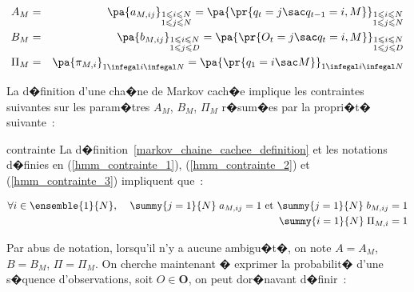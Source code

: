        \begin{eqnarray*}
        A_M    &=& \pa {  a_{M,ij} } _ {\substack{ 1\leqslant i\leqslant N\\1\leqslant j\leqslant N}} =
                   \pa{ \pr {  q_{t}=j \sac  q_{t-1} =i,M } } _{\substack{1\leqslant i\leqslant N\\1\leqslant j\leqslant N}}
                    \label{hmm_contrainte_1}\\
        B_M    &=& \pa{   b_{M,ij} } _ {\substack{1\leqslant i\leqslant N\\1\leqslant j\leqslant D}}=
                   \pa { \pr{ O_{t}=j \sac  q_{t}=i,M } }     _ {\substack{1\leqslant i\leqslant N\\1\leqslant j\leqslant D}}
                    \label{hmm_contrainte_2}\\
        \Pi_M  &=& \pa { \pi_{M,i} } _ { 1 \infegal i \infegal N } = \pa { \pr {  q_1 = i \sac M} } _ { 1 \infegal i \infegal N }
                             \label{hmm_contrainte_3}
        \end{eqnarray*}


La d�finition d'une cha�ne de Markov cach�e implique les contraintes suivantes sur les param�tres $A_M$, $B_M$, $\Pi_M$
r�sum�es par la propri�t� suivante~:


        \begin{xproperty}{contrainte}
        \label{propriete_mmc_contrainte}%
        La d�finition~\ref{markov_chaine_cachee_definition} et les notations d�finies en (\ref{hmm_contrainte_1}),
        (\ref{hmm_contrainte_2}) et (\ref{hmm_contrainte_3}) impliquent que~:
        
                \begin{eqnarray*}
                \forall i\in \ensemble{1}{N}, \; &&\summy{j=1}{N} \; a_{M,ij}=1 \text{ et }
                                                                                    \summy{j=1}{N} \; b_{M,ij}=1 \\
                                                 &&\summy{i=1}{N} \; \Pi_{M,i} = 1
                \end{eqnarray*}
        \end{xproperty}


Par abus de notation, lorsqu'il n'y a aucune ambigu�t�, on note $A=A_M$, $B=B_M$, $\Pi=\Pi_M$. On cherche maintenant � exprimer la probabilit� d'une s�quence d'observations, soit $O \in \mathbf{O}$, on peut dor�navant d�finir~:


